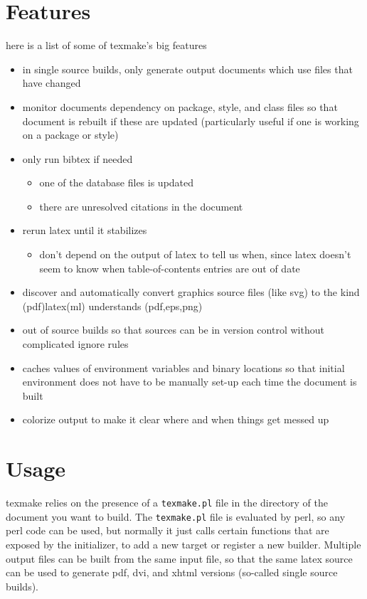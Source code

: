 \section{Features}

here is a list of some of texmake's big features

\begin{itemize}
    \item in single source builds, only generate output documents which use files that have changed
    \item monitor documents dependency on package, style, and class files so that document is rebuilt if these are updated (particularly useful if one is working on a package or style)
    \item only run bibtex if needed
    \begin{itemize}
        \item one of the database files is updated
        \item there are unresolved citations in the document
    \end{itemize}
    \item rerun latex until it stabilizes 
    \begin{itemize}
        \item don't depend on the output of latex to tell us when, since latex doesn't seem to know when table-of-contents entries are out of date
    \end{itemize}
    \item discover and automatically convert graphics source files (like svg) to the kind (pdf)latex(ml) understands (pdf,eps,png)
    \item out of source builds so that sources can be in version control without complicated ignore rules
    \item caches values of environment variables and binary locations so that initial environment does not have to be manually set-up each time the document is built
    \item colorize output to make it clear where and when things get messed up
\end{itemize}


\section{Usage}

texmake relies on the presence of a \verb|texmake.pl| file in the directory of the document you want to build. 
%
The \verb|texmake.pl| file is evaluated by perl, so any perl code can be used, but normally it just calls certain functions that are exposed by the initializer, to add a new target or register a new builder. 
%
Multiple output files can be built from the same input file, so that the same latex source can be used to generate pdf, dvi, and xhtml versions (so-called single source builds). 

